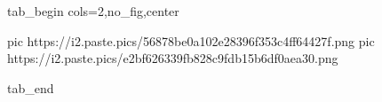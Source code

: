  
 
 
 
 

\ifcmt
  tab_begin cols=2,no_fig,center

     pic https://i2.paste.pics/56878be0a102e28396f353c4ff64427f.png
		 pic https://i2.paste.pics/e2bf626339fb828c9fdb15b6df0aea30.png

  tab_end
\fi
